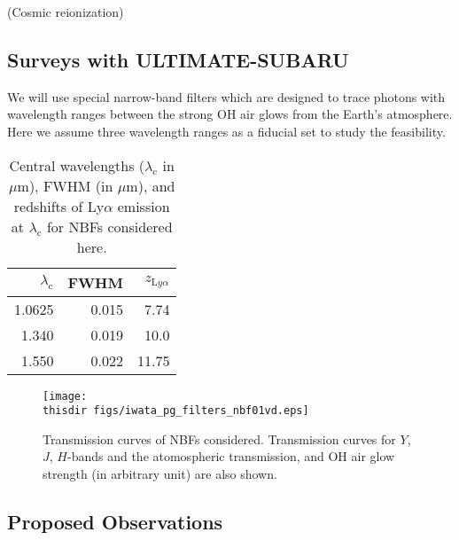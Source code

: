 (Cosmic reionization)


\subsection{Surveys with ULTIMATE-SUBARU}

We will use special narrow-band filters which are designed to trace
photons with wavelength ranges between the strong OH air glows from the
Earth's atmosphere.
Here we assume three wavelength ranges as a fiducial set to study the
feasibility.

\begin{table}[!ht]
\begin{center}
\begin{tabular}{rrr}
\hline
$\lambda_\mathrm{c}$ & FWHM & $z_{\mathrm Ly\alpha}$\\
\hline
1.0625 & 0.015  &  7.74\\
1.340  & 0.019  & 10.0 \\
1.550  & 0.022  & 11.75\\
\hline
\end{tabular}
\end{center}
\caption{
Central wavelengths ($\lambda_\mathrm{c}$ in $\mu$m), FWHM (in $\mu$m),
 and redshifts of Ly$\alpha$ emission at $\lambda_\mathrm{c}$ for NBFs
 considered here.
}
\label{tab:iwata_nbf_setup}
\end{table}

\begin{figure}[!ht]
\centerline{
\texttt{[image: \\thisdir figs/iwata\_pg\_filters\_nbf01vd.eps]}
}
\caption{
Transmission curves of NBFs considered. Transmission curves for $Y$,
 $J$, $H$-bands and the atomospheric transmission, and OH air glow
 strength (in arbitrary unit) are also shown.
}
\label{fig:iwata_filter_nbf}
\end{figure}

\par{}


\par{}

\subsection{Proposed Observations}

\par{}

